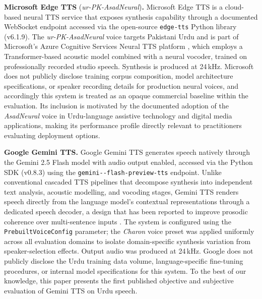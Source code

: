 \documentclass[a4paper,fleqn]{cas-dc}
\begin{document}
\begin{sloppypar}
    \indent\textbf{Microsoft Edge TTS} (\textit{ur-PK-AsadNeural})\textbf{.}
    Microsoft Edge TTS is a cloud-based neural TTS service that exposes synthesis
    capability through a documented WebSocket endpoint accessed via the open-source
    \texttt{edge-tts} Python library (v6.1.9). The \textit{ur-PK-AsadNeural} voice
    targets Pakistani Urdu and is part of Microsoft's Azure Cognitive Services
    Neural TTS platform \citep{microsoft2023azure}, which employs a
    Transformer-based acoustic model combined with a neural vocoder, trained on
    professionally recorded studio speech. Synthesis is produced at 24\,kHz.
    Microsoft does not publicly disclose training corpus composition, model
    architecture specifications, or speaker recording details for production neural
    voices, and accordingly this system is treated as an opaque commercial baseline
    within the evaluation. Its inclusion is motivated by the documented adoption of
    the \textit{AsadNeural} voice in Urdu-language assistive technology and
    digital media applications, making its performance profile directly relevant
    to practitioners evaluating deployment options.
    
    \indent\textbf{Google Gemini TTS.}
    Google Gemini TTS generates speech natively through the Gemini 2.5 Flash
    model with audio output enabled, accessed via the 
    Python SDK (v0.8.3) using the \texttt{gemini--\-flash-\-preview-\-tts} endpoint.
    Unlike conventional cascaded TTS pipelines that decompose synthesis into
    independent text analysis, acoustic modelling, and vocoding stages, Gemini
    TTS renders speech directly from the language model's contextual
    representations through a dedicated speech decoder, a design that has been
    reported to improve prosodic coherence over multi-sentence inputs
    \citep{google2025gemini}. The system is configured using the
    \texttt{Prebuilt\-Voice\-Config} parameter; the \textit{Charon} voice preset was
    applied uniformly across all evaluation domains to isolate domain-specific
    synthesis variation from speaker-selection effects. Output audio was produced
    at 24\,kHz. Google does not publicly disclose the Urdu training data volume,
    language-specific fine-tuning procedures, or internal model specifications
    for this system. To the best of our knowledge, this paper presents the first
    published objective and subjective evaluation of Gemini TTS on Urdu speech.
    \end{sloppypar}
    
\end{document}
